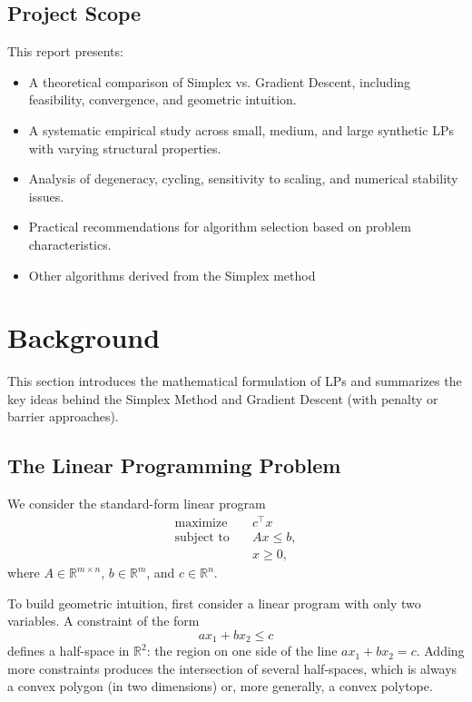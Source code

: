 \documentclass[11pt]{article}
\begin{document}
\subsection{Project Scope}
This report presents:
\begin{itemize}
    \item A theoretical comparison of Simplex vs. Gradient Descent, including feasibility, convergence, and geometric intuition.
    \item A systematic empirical study across small, medium, and large synthetic LPs with varying structural properties.
    \item Analysis of degeneracy, cycling, sensitivity to scaling, and numerical stability issues.
    \item Practical recommendations for algorithm selection based on problem characteristics.
    \item Other algorithms derived from the Simplex method
\end{itemize}




\section{Background}
This section introduces the mathematical formulation of LPs and summarizes the key ideas behind the Simplex Method and Gradient Descent (with penalty or barrier approaches).

\subsection{The Linear Programming Problem}
We consider the standard-form linear program
\begin{align}
    \text{maximize} \quad & c^\top x \\
    \text{subject to} \quad & Ax \le b, \\
    & x \ge 0,
\end{align}
where \(A \in \mathbb{R}^{m \times n}\), \(b \in \mathbb{R}^m\), and \(c \in \mathbb{R}^n\).

To build geometric intuition, first consider a linear program with only two variables.  
A constraint of the form
\[
ax_1 + bx_2 \le c
\]
defines a half-space in \(\mathbb{R}^2\): the region on one side of the line \(ax_1 + bx_2 = c\).  
Adding more constraints produces the intersection of several half-spaces, which is always a convex polygon (in two dimensions) or, more generally, a convex polytope.
\end{document}
